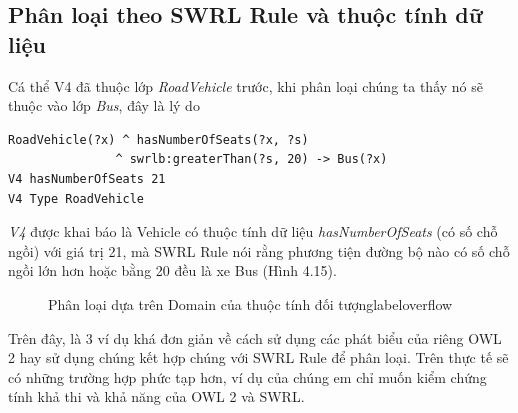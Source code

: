 \subsection{Phân loại theo SWRL Rule và thuộc tính dữ liệu} 
Cá thể V4 đã thuộc lớp \textit{RoadVehicle} trước, khi phân loại chúng ta thấy nó sẽ thuộc vào lớp \textit{Bus}, đây là lý do \begin{verbatim}
RoadVehicle(?x) ^ hasNumberOfSeats(?x, ?s) 
               ^ swrlb:greaterThan(?s, 20) -> Bus(?x)
V4 hasNumberOfSeats 21
V4 Type RoadVehicle
\end{verbatim}
\textit{V4} được khai báo là Vehicle có thuộc tính dữ liệu \textit{hasNumberOfSeats} (có số chỗ ngồi) với giá trị 21, mà SWRL Rule nói rằng phương tiện đường bộ nào có số chỗ ngồi lớn hơn hoặc bằng 20 đều là xe Bus (Hình 4.15).
\begin{figure}[h!]
	\centering
	\caption{Phân loại dựa trên Domain của thuộc tính đối tượnglabel{overflow}}
\end{figure}
Trên đây, là 3 ví dụ khá đơn giản về cách sử dụng các phát biểu của riêng OWL 2 hay sử dụng chúng kết hợp chúng với SWRL Rule để phân loại. Trên thực tế sẽ có những trường hợp phức tạp hơn, ví dụ của chúng em chỉ muốn kiểm chứng tính khả thi và khả năng của OWL 2 và SWRL.
